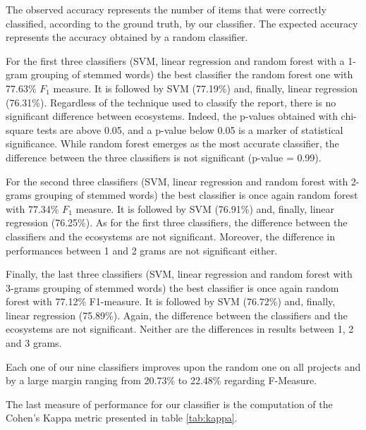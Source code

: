 \documentclass[12pt]{report}
\begin{document}
The observed accuracy represents the number of items that were correctly
classified, according to the ground truth, by our classifier. The
expected accuracy represents the accuracy obtained by a random
classifier.



For the first three classifiers (SVM, linear regression and random
forest with a 1-gram grouping of stemmed words) the best classifier the
random forest one with 77.63\% \(F_1\) measure. It is followed by SVM
(77.19\%) and, finally, linear regression (76.31\%). Regardless of the
technique used to classify the report, there is no significant
difference between ecosystems. Indeed, the p-values obtained with
chi-square tests are above 0.05, and a p-value below 0.05 is a marker of
statistical significance. While random forest emerges as the most
accurate classifier, the difference between the three classifiers is not
significant (p-value = 0.99).



For the second three classifiers (SVM, linear regression and random
forest with 2-grams grouping of stemmed words) the best classifier is
once again random forest with 77.34\% \(F_1\) measure. It is followed by
SVM (76.91\%) and, finally, linear regression (76.25\%). As for the
first three classifiers, the difference between the classifiers and the
ecosystems are not significant. Moreover, the difference in performances
between 1 and 2 grams are not significant either.



Finally, the last three classifiers (SVM, linear regression and random
forest with 3-grams grouping of stemmed words) the best classifier is
once again random forest with 77.12\% F1-measure. It is followed by SVM
(76.72\%) and, finally, linear regression (75.89\%). Again, the
difference between the classifiers and the ecosystems are not
significant. Neither are the differences in results between 1, 2 and 3
grams.



Each one of our nine classifiers improves upon the random one on all
projects and by a large margin ranging from 20.73\% to 22.48\% regarding
F-Measure.

The last measure of performance for our classifier is the computation of
the Cohen's Kappa metric presented in table \ref{tab:kappa}.


\end{document}

